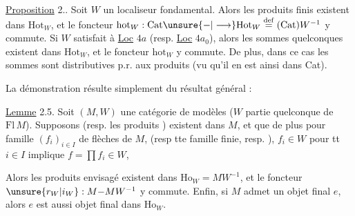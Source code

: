 
\uline{Proposition} 2.. Soit $W$ un localiseur fondamental. Alors les produits finis existent dans $\mathrm{Hot}_W$, et le foncteur $\mathrm{hot}_W:\mathrm{Cat}\unsure{{-}|\longrightarrow}\mathrm{Hot}_W\overset{\mathrm{def}}{=}(\mathrm{Cat})W^{-1}$ y commute. Si $W$ satisfait à \uline{Loc} $4a$ (resp. \uline{Loc} $4a_0$), alors les sommes quelconques  existent dans $\mathrm{Hot}_W$, et le foncteur $\mathrm{hot}_W$ y commute. De plus, dans ce cas les sommes sont distributives p.r. aux produits (vu qu'il en est ainsi dans Cat).

La démonstration résulte simplement du résultat général :

\uline{Lemme} 2.5. Soit $(M,W)$ une catégorie de modèles ($W$ partie quelconque de $\mathrm{Fl}\,M$). Supposons   (resp. les produits )  existent dans $M$, et que de plus pour  famille $(f_i)_{i\in I}$ de flèches de $M$,  (resp tte famille finie, resp. ),  $f_i\in W$ pour tt $i\in I$ implique $f=\prod f_i\in W$,

Alors les produits  envisagé existent dans $\mathrm{Ho}_W=MW^{-1}$, et le foncteur  $\unsure{r_W|i_W}:M{-}MW^{-1}$ y commute. Enfin, si $M$ admet un objet final $e$, alors $e$ est aussi objet final dans $\mathrm{Ho}_W$.

